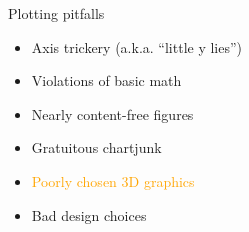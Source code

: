 \documentclass[
  ignorenonframetext,
]{beamer}
\providecommand{\tightlist}{%
  \setlength{\itemsep}{0pt}\setlength{\parskip}{0pt}}
\begin{document}
\begin{frame}{}
\label{section-18}
\end{frame}

\begin{frame}{Plotting pitfalls}
\label{plotting-pitfalls-4}
\begin{itemize}
\tightlist
\item
  Axis trickery (a.k.a. ``little y lies'')
\item
  Violations of basic math
\item
  Nearly content-free figures
\item
  Gratuitous chartjunk
\item
  \textcolor{orange}{Poorly chosen 3D graphics}
\item
  Bad design choices
\end{itemize}
\end{frame}

\begin{frame}{}
\label{section-19}
\end{frame}
\end{document}

